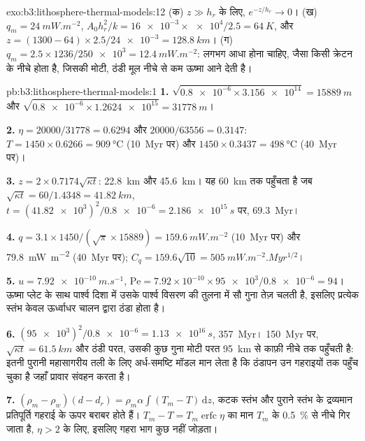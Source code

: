 \begin{solution}{exo:b3:lithosphere-thermal-models:12}
(क) $z \gg h_r$ के लिए, $e^{-z/h_r} \to 0$। (ख) $q_m = \qty{24}{mW.m^{-2}}$,
$A_0h_r^2/k = \num{16e-3}\times\num{e4}/2.5 = \qty{64}{K}$, और $z = (1300 -
64)\times2.5/\num{24e-3} = \qty{128.8}{km}$। (ग) $q_m = 2.5\times1236/\num{250e3}
= \qty{12.4}{mW.m^{-2}}$:  लगभग आधा होना चाहिए, जैसा
किसी क्रेटन के नीचे होता है, जिसकी मोटी, ठंडी मूल नीचे से कम ऊष्मा आने देती है।
\end{solution}

\begin{solution}{pb:b3:lithosphere-thermal-models:1}
\textbf{1.} $\sqrt{\num{0.8e-6}\times\num{3.156e14}} = \qty{15889}{m}$ और
$\sqrt{\num{0.8e-6}\times\num{1.2624e15}} = \qty{31778}{m}$।

\textbf{2.} $\eta = 20000/31778 = 0.6294$ और $20000/63556 = 0.3147$:
$T = 1450\times0.6266 = \qty{909}{\celsius}$ (\qty{10}{Myr} पर) और
$1450\times0.3437 = \qty{498}{\celsius}$ (\qty{40}{Myr} पर)।

\textbf{3.} $z = 2\times0.7174\sqrt{\kappa t}$: \qty{22.8}{km} और
\qty{45.6}{km}। यह \qty{60}{km} तक पहुँचता है जब $\sqrt{\kappa t} = 60/1.4348 =
\qty{41.82}{km}$, $t = (\num{41.82e3})^2/\num{0.8e-6} = \qty{2.186e15}{s}$ पर,
\qty{69.3}{Myr}।

\textbf{4.} $q = 3.1\times1450/(\sqrt\pi\times15889) = \qty{159.6}{mW.m^{-2}}$ (\qty{10}{Myr} पर) और
\qty{79.8}{mW.m^{-2}} (\qty{40}{Myr} पर); $C_q = 159.6\sqrt{10}
= \qty{505}{mW.m^{-2}.Myr^{1/2}}$।

\textbf{5.} $u = \qty{7.92e-10}{m.s^{-1}}$, $\mathrm{Pe} = 7.92\times10^{-10}
\times\num{95e3}/\num{0.8e-6} = 94$। ऊष्मा प्लेट के साथ पार्श्व दिशा में
उसके पार्श्व विसरण की तुलना में सौ गुना तेज़ चलती है, इसलिए प्रत्येक
स्तंभ केवल ऊर्ध्वाधर चालन द्वारा ठंडा होता है।

\textbf{6.} $(\num{95e3})^2/\num{0.8e-6} = \qty{1.13e16}{s}$, \qty{357}{Myr}।
\qty{150}{Myr} पर, $\sqrt{\kappa t} = \qty{61.5}{km}$ और ठंडी परत,
उसकी कुछ गुना मोटी परत \qty{95}{km} से काफ़ी नीचे तक पहुँचती है:
इतनी पुरानी महासागरीय तली के लिए अर्ध-समष्टि मॉडल मान लेता है कि ठंडापन उन गहराइयों तक पहुँच चुका है जहाँ प्रावार संवहन करता है।

\textbf{7.} $(\rho_m - \rho_w)(d - d_r) = \rho_m\alpha\int(T_m - T)\,\mathrm dz$,
कटक स्तंभ और पुराने स्तंभ के द्रव्यमान प्रतिपूर्ति गहराई के ऊपर
बराबर होते हैं। $T_m - T = T_m\operatorname{erfc}\eta$ का मान
$T_m$ के \qty{0.5}{\percent} से नीचे गिर जाता है, $\eta > 2$ के लिए, इसलिए गहरा भाग कुछ नहीं जोड़ता।


\end{solution}
